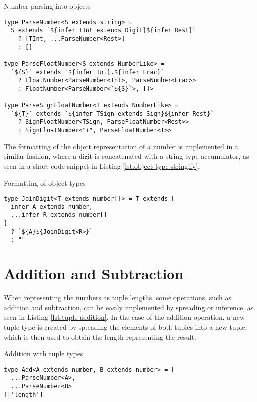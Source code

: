 \begin{listing}[ht]
  \caption{Number parsing into objects}\label{lst:object-parse}
  \begin{verbatim}
type ParseNumber<S extends string> =
  S extends `${infer TInt extends Digit}${infer Rest}`
    ? [TInt, ...ParseNumber<Rest>]
    : []

type ParseFloatNumber<S extends NumberLike> =
  `${S}` extends `${infer Int}.${infer Frac}`
    ? FloatNumber<ParseNumber<Int>, ParseNumber<Frac>>
    : FloatNumber<ParseNumber<`${S}`>, []>

type ParseSignFloatNumber<T extends NumberLike> =
  `${T}` extends `${infer TSign extends Sign}${infer Rest}`
    ? SignFloatNumber<TSign, ParseFloatNumber<Rest>>
    : SignFloatNumber<"+", ParseFloatNumber<T>>
\end{verbatim}
\end{listing}

The formatting of the object representation of a number is implemented in a similar fashion, where a digit is concatenated with a string-type accumulator, as seen in a short code snippet in Listing \ref{lst:object-type-stringify}.

\begin{listing}[ht]
  \caption{Formatting of object types}\label{lst:object-type-stringify}
  \begin{verbatim}
type JoinDigit<T extends number[]> = T extends [
  infer A extends number,
  ...infer R extends number[]
]
  ? `${A}${JoinDigit<R>}`
  : ""
\end{verbatim}
\end{listing}

\section{Addition and Subtraction}

When representing the numbers as tuple lengths, some operations, such as addition and subtraction, can be easily implemented by spreading or inference, as seen in Listing \ref{lst:tuple-addition}. In the case of the addition operation, a new tuple type is created by spreading the elements of both tuples into a new tuple, which is then used to obtain the length representing the result.

\begin{listing}[ht]
  \caption{Addition with tuple types}\label{lst:tuple-addition}
  \begin{verbatim}
type Add<A extends number, B extends number> = [
  ...ParseNumber<A>, 
  ...ParseNumber<B>
]['length']
\end{verbatim}
\end{listing}

